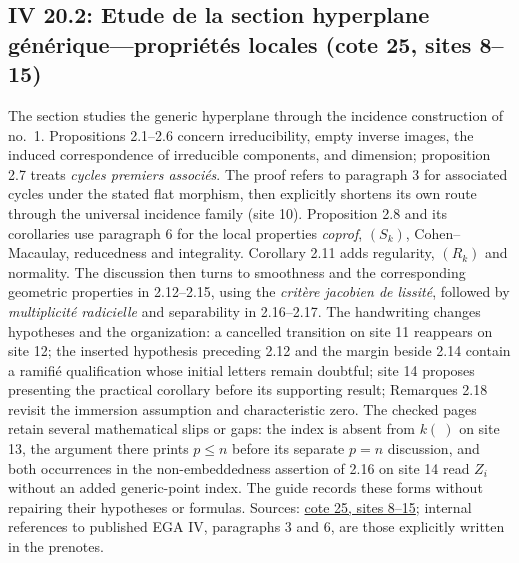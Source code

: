 \subsection*{IV 20.2: Etude de la section hyperplane générique---propriétés locales (cote 25, sites 8--15)}
The section studies the generic hyperplane through the incidence construction of no.\ 1. Propositions 2.1--2.6 concern irreducibility, empty inverse images, the induced correspondence of irreducible components, and dimension; proposition 2.7 treats \emph{cycles premiers associés}. The proof refers to paragraph 3 for associated cycles under the stated flat morphism, then explicitly shortens its own route through the universal incidence family (site 10). Proposition 2.8 and its corollaries use paragraph 6 for the local properties \emph{coprof}, $(S_k)$, Cohen--Macaulay, reducedness and integrality. Corollary 2.11 adds regularity, $(R_k)$ and normality. The discussion then turns to smoothness and the corresponding geometric properties in 2.12--2.15, using the \emph{critère jacobien de lissité}, followed by \emph{multiplicité radicielle} and separability in 2.16--2.17. The handwriting changes hypotheses and the organization: a cancelled transition on site 11 reappears on site 12; the inserted hypothesis preceding 2.12 and the margin beside 2.14 contain a ramifié qualification whose initial letters remain doubtful; site 14 proposes presenting the practical corollary before its supporting result; Remarques 2.18 revisit the immersion assumption and characteristic zero. The checked pages retain several mathematical slips or gaps: the index is absent from $k(\ )$ on site 13, the argument there prints $p\leq n$ before its separate $p=n$ discussion, and both occurrences in the non-embeddedness assertion of 2.16 on site 14 read $Z_i$ without an added generic-point index. The guide records these forms without repairing their hypotheses or formulas. Sources: \href{https://grothendieck.umontpellier.fr/web/viewer.html?file=../25.pdf\#page=9}{cote 25, sites 8--15}; internal references to published EGA IV, paragraphs 3 and 6, are those explicitly written in the prenotes.
